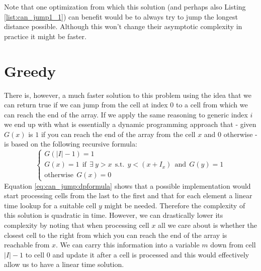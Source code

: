 

Note that one optimization from which this solution (and perhaps also Listing
\ref{list:can_jump1_1}) can benefit would be to always try to jump the longest distance possible.
Although this won't change their asymptotic complexity in practice it might be faster.


\section{Greedy}
\label{can_jump:sec:greedy}
There is, however, a much faster solution to this problem using the idea that we can return
true if we can jump from the cell at index $0$ to a cell from which we can reach the end of the
array. If we apply the same reasoning to generic index $i$ we end up with what is essentially a dynamic
programming approach that -  given $G(x)$ is $1$ if you can reach the end of the array from the cell
$x$ and $0$ otherwise - is based on the following recursive formula:
\begin{equation}
    \begin{cases}
        G(|I|-1) = 1 \\
        G(x) = 1 \: \: \text{if} \: \: \exists \: y > x \:\: \text{s.t.} \:\: y < (x+I_x) \: \: \text{and} \: \:G(y) = 1\\
        \text{otherwise} \: \: G(x) = 0
     \end{cases}
    \label{eq:can_jump:dpformula}
\end{equation}
Equation \ref{eq:can_jump:dpformula} shows that a possible implementation would start processing
cells from the last to the first and that for each element a linear time lookup for a suitable cell
$y$ might be needed. Therefore the complexity of this solution is quadratic in time. However, we can
drastically lower its complexity by noting that when processing cell $x$ all we care about is
whether the closest cell to the right from which you can reach the end of the array is reachable
from $x$. We can carry this information into a variable $m$ down from cell $|I|-1$ to cell $0$ and
update it after a cell is processed and this would effectively allow us to have a linear time
solution.

